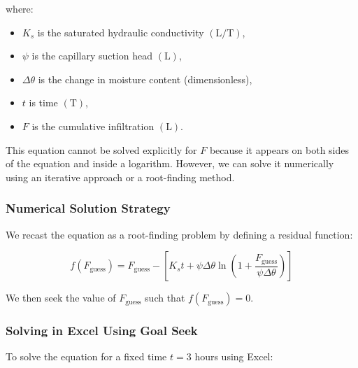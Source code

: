 \documentclass[12pt]{article}
\begin{document}
\begin{enumerate}
\noindent where:
\begin{itemize}
    \item \( K_s \) is the saturated hydraulic conductivity \((\text{L/T})\),
    \item \( \psi \) is the capillary suction head \((\text{L})\),
    \item \( \Delta \theta \) is the change in moisture content (dimensionless),
    \item \( t \) is time \((\text{T})\),
    \item \( F \) is the cumulative infiltration \((\text{L})\).
\end{itemize}

\noindent This equation cannot be solved explicitly for \( F \) because it appears on both sides of the equation and inside a logarithm. However, we can solve it numerically using an iterative approach or a root-finding method.

\subsubsection*{Numerical Solution Strategy}

We recast the equation as a root-finding problem by defining a residual function:

\[
f(F_{\text{guess}}) = F_{\text{guess}} - \left[ K_s t + \psi \Delta \theta \ln \left(1 + \frac{F_{\text{guess}}}{\psi \Delta \theta} \right) \right]
\]

\noindent We then seek the value of \( F_{\text{guess}} \) such that \( f(F_{\text{guess}}) = 0 \).

\subsubsection*{Solving in Excel Using Goal Seek}

To solve the equation for a fixed time \( t = 3 \) hours using Excel:


\end{enumerate}
\end{document}
